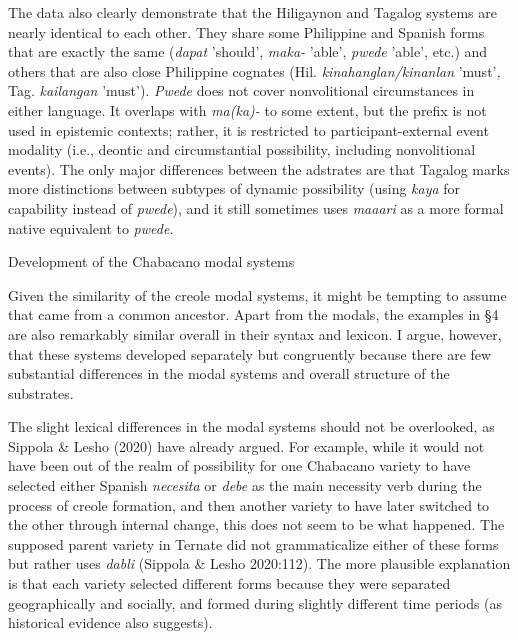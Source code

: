 \begin{styleStandard}
The data also clearly demonstrate that the Hiligaynon and Tagalog systems are nearly identical to each other. They share some Philippine and Spanish forms that are exactly the same (\textit{dapat }{}'should', \textit{maka-} 'able', \textit{pwede} 'able', etc.) and others that are also close Philippine cognates (Hil. \textit{kinahanglan/kinanlan} 'must'\textit{, }Tag. \textit{kailangan} 'must'). \textit{Pwede }does not cover nonvolitional circumstances in either language. It overlaps with \textit{ma(ka)-} to some extent, but the prefix is not used in epistemic contexts; rather, it is restricted to participant-external event modality (i.e., deontic and circumstantial possibility, including nonvolitional events).\textit{ }The only major differences between the adstrates are that Tagalog marks more distinctions between subtypes of dynamic possibility (using \textit{kaya} for capability instead of \textit{pwede}), and it still sometimes uses \textit{maaari} as a more formal native equivalent to \textit{pwede}.
\end{styleStandard}

\begin{listWWNumiiileveli}
\item 
\begin{listWWNumiiilevelii}
\item 
\begin{stylelsSectionii}
Development of the Chabacano modal systems
\end{stylelsSectionii}
\end{listWWNumiiilevelii}
\end{listWWNumiiileveli}
\begin{styleStandard}
Given the similarity of the creole modal systems, it might be tempting to assume that came from a common ancestor. Apart from the modals, the examples in §4 are also remarkably similar overall in their syntax and lexicon. I argue, however, that these systems developed separately but congruently because there are few substantial differences in the modal systems and overall structure of the substrates. 
\end{styleStandard}

\begin{styleStandard}
The slight lexical differences in the modal systems should not be overlooked, as Sippola \& Lesho (2020) have already argued. For example, while it would not have been out of the realm of possibility for one Chabacano variety to have selected either Spanish \textit{necesita} or \textit{debe} as the main necessity verb during the process of creole formation, and then another variety to have later switched to the other through internal change, this does not seem to be what happened. The supposed parent variety in Ternate did not grammaticalize either of these forms but rather uses \textit{dabli} (Sippola \& Lesho 2020:112). The more plausible explanation is that each variety selected different forms because they were separated geographically and socially, and formed during slightly different time periods (as historical evidence also suggests). 
\end{styleStandard}


